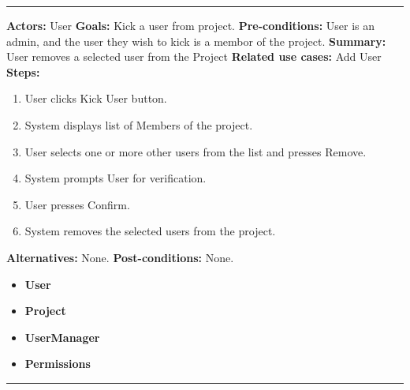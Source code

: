 \documentclass[twoside,letterpaper]{article}
\begin{document}
\vspace{2pt}
\hrule
\vspace{8pt}
 \textbf{Actors:} User \newline
\textbf{Goals:} Kick a user from project. \newline
 \textbf{Pre-conditions:} User is an admin, and the user they wish to kick is a membor of the project. \newline
 \textbf{Summary:} User removes a selected user from the Project \newline
\textbf{Related use cases:} Add User \newline
\textbf{Steps:} \begin{enumerate}
  \item User clicks Kick User button.
  \item System displays list of Members of the project.
  \item User selects one or more other users from the list and presses Remove.
  \item System prompts User for verification.
  \item User presses Confirm.
  \item System removes the selected users from the project.
 \end{enumerate}
 \textbf{Alternatives:} None. \newline
 \textbf{Post-conditions:} None. \newline
\begin{itemize}
	\item \textbf{User}
	\item \textbf{Project}
	\item \textbf{UserManager}
	\item \textbf{Permissions}
\end{itemize}
\vspace{8pt}
\hrule
\newpage
\end{document}
